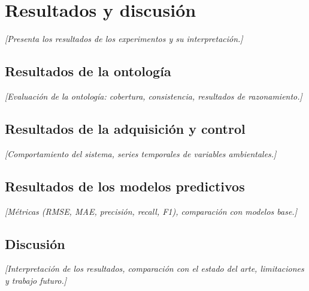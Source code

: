 
\chapter{Resultados y discusión}
\label{cap:resultados}

\textit{[Presenta los resultados de los experimentos y su interpretación.]}

\section{Resultados de la ontología}
\label{sec:resultados-ontologia}

\textit{[Evaluación de la ontología: cobertura, consistencia, resultados de razonamiento.]}

\section{Resultados de la adquisición y control}
\label{sec:resultados-control}

\textit{[Comportamiento del sistema, series temporales de variables ambientales.]}

\section{Resultados de los modelos predictivos}
\label{sec:resultados-modelos}

\textit{[Métricas (RMSE, MAE, precisión, recall, F1), comparación con modelos base.]}

\section{Discusión}
\label{sec:discusion}

\textit{[Interpretación de los resultados, comparación con el estado del arte, limitaciones
y trabajo futuro.]}
